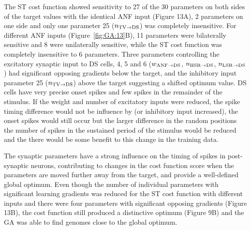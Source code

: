 The ST cost function showed sensitivity to 27 of the 30 parameters on
both sides of the target values with the identical ANF input (Figure
13A), 2 parameters on one side and only one parameter 25 ($n_{{\rm
    TV}\to {\rm DS}} $) was completely insensitive. For different ANF
inputs (Figure~\ref{fig:GA:13}B), 11 parameters were bilaterally
sensitive and 8 were unilaterally sensitive, while the ST cost
function was completely insensitive to 6 parameters. Three parameters
controlling the excitatory synaptic input to DS cells, 4, 5 and 6
($w_{{\rm ANF}\to {\rm DS}} $, $n_{{\rm HSR}\to {\rm DS}} $, $n_{{\rm
    LSR}\to {\rm DS}} $) had significant opposing gradients below the
target, and the inhibitory input parameter 25 ($n_{{\rm TV}\to {\rm
    DS}} $) above the target suggesting a shifted optimum value.  DS
cells have very precise onset spikes and few spikes in the remainder
of the stimulus.  If the weight and number of excitatory inputs were
reduced, the spike timing difference would not be influence by (or
inhibitory input increased), the onset spikes would still occur but
the larger difference in the random positions the number of spikes in
the sustained period of the stimulus would be reduced and the there
would be some benefit to this change in the training data.

\smallskip{}

The synaptic parameters have a strong influence on the timing of
spikes in post-synaptic neurons, contributing to changes in the cost
function score when the parameters are moved further away from the
target, and provide a well-defined global optimum. Even though the
number of individual parameters with significant learning gradients
was reduced for the ST cost function with different inputs and there
were four parameters with significant opposing gradients (Figure 13B),
the cost function still produced a distinctive optimum (Figure 9B) and
the GA was able to find genomes close to the global optimum.

\smallskip{}



